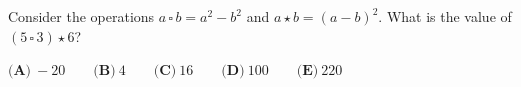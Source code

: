Consider the operations $a\,\square\,b=a^2-b^2$ and $a\star b=(a-b)^2$. What is the value of $(5\,\square\,3)\star6$?

$\textbf{(A)}\ -20\qquad\textbf{(B)}\ 4\qquad\textbf{(C)}\ 16\qquad\textbf{(D)}\ 100\qquad\textbf{(E)}\ 220$
